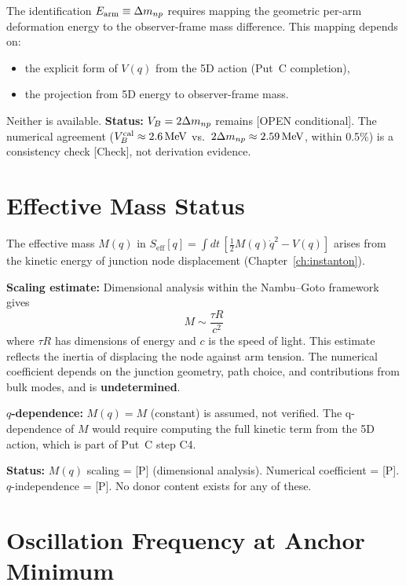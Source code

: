 The identification $E_{\text{arm}} \equiv \Delta m_{np}$ requires mapping the
geometric per-arm deformation energy to the observer-frame mass difference.
This mapping depends on:
\begin{itemize}
    \item the explicit form of $V(q)$ from the 5D action (Put~C completion),
    \item the projection from 5D energy to observer-frame mass.
\end{itemize}

Neither is available. \textbf{Status:} $V_B = 2\Delta m_{np}$ remains
[OPEN conditional]. The numerical agreement
($V_B^{\mathrm{cal}} \approx 2.6\,\mathrm{MeV}$ vs.\ $2\Delta m_{np} \approx 2.59\,\mathrm{MeV}$,
within 0.5\%) is a consistency check [Check], not derivation evidence.

\section{Effective Mass Status}
\label{sec:vq:mass}

The effective mass $M(q)$ in $S_{\mathrm{eff}}[q] = \int dt\,[\frac{1}{2}
M(q)\dot{q}^2 - V(q)]$ arises from the kinetic energy of junction node
displacement (Chapter~\ref{ch:instanton}).

\textbf{Scaling estimate:} Dimensional analysis within the Nambu--Goto
framework gives
\begin{equation}
    M \sim \frac{\tau R}{c^2}
    \label{eq:M_scaling}
\end{equation}
where $\tau R$ has dimensions of energy and $c$ is the speed of light. This
estimate reflects the inertia of displacing the node against arm tension.
The numerical coefficient depends on the junction geometry, path choice,
and contributions from bulk modes, and is \textbf{undetermined}.

\textbf{$q$-dependence:} $M(q) = M$ (constant) is assumed, not verified.
The q-dependence of $M$ would require computing the full kinetic term from
the 5D action, which is part of Put~C step C4.

\textbf{Status:} $M(q)$ scaling = [P] (dimensional analysis). Numerical
coefficient = [P]. $q$-independence = [P]. No donor content exists for any
of these.

\section{Oscillation Frequency at Anchor Minimum}
\label{sec:vq:omega}

